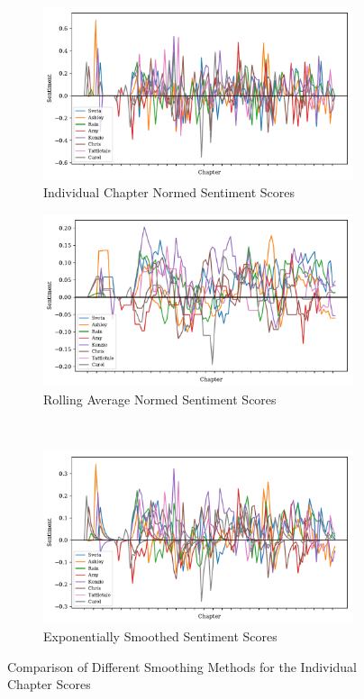 \documentclass[11pt]{article}
\begin{document}
\begin{figure}[H]
\centering
\begin{subfigure}[t]{0.45\textwidth}
\centering
\includegraphics[width=\textwidth]{Full Graphs v2/ind_sent_scores.pdf}
\caption{Individual Chapter Normed Sentiment Scores}
\label{smooth_compare_1}
\end{subfigure}

\begin{subfigure}[t]{0.45\textwidth}
\centering
\includegraphics[width=\textwidth]{Full Graphs v2/mean_smoothed_sent_scores.pdf}
\caption{Rolling Average Normed Sentiment Scores}
\label{smooth_compare_2}
\end{subfigure}
~
\begin{subfigure}[t]{0.45\textwidth}
\centering
\includegraphics[width=\textwidth]{Full Graphs v2/exp_smooth_sent_scores.pdf}
\caption{Exponentially Smoothed Sentiment Scores}
\label{smooth_compare_3}
\end{subfigure}
\label{smoothing_comparison}
\caption{Comparison of Different Smoothing Methods for the Individual Chapter Scores}
\end{figure}
\end{document}
